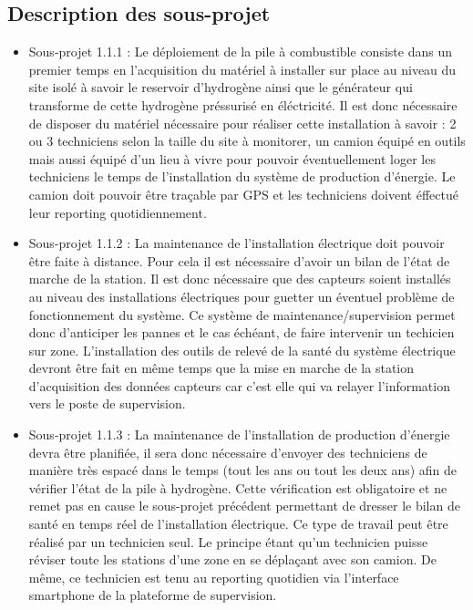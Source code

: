 \subsection{Description des sous-projet}

\begin{itemize}
\item Sous-projet 1.1.1 : Le déploiement de la pile à combustible consiste dans un premier temps en l'acquisition du matériel à installer sur place au niveau du site isolé à savoir le reservoir d'hydrogène ainsi que le générateur qui transforme de cette hydrogène préssurisé en éléctricité. Il est donc nécessaire de disposer du matériel nécessaire pour réaliser cette installation à savoir :  2 ou 3 techniciens selon la taille du site à monitorer, un camion équipé en outils mais aussi équipé d'un lieu à vivre pour pouvoir éventuellement loger les techniciens le temps de l'installation du système de production d'énergie. Le camion doit pouvoir être traçable par GPS et les techniciens doivent éffectué leur reporting quotidiennement.
\item Sous-projet 1.1.2 : La maintenance de l'installation électrique doit pouvoir être faite à distance. Pour cela il est nécessaire d'avoir un bilan de l'état de marche de la station. Il est donc nécessaire que des capteurs soient installés au niveau des installations électriques pour guetter un éventuel problème de fonctionnement du système. Ce système de maintenance/supervision permet donc d'anticiper les pannes et le cas échéant, de faire intervenir un techicien sur zone. L'installation des outils de relevé de la santé du système électrique devront être fait en même temps que la mise en marche de la station d'acquisition des données capteurs car c'est elle qui va relayer l'information vers le poste de supervision.
\item Sous-projet 1.1.3 : La maintenance de l'installation de production d'énergie devra être planifiée, il sera donc nécessaire d'envoyer des techniciens de manière très espacé dans le temps (tout les ans ou tout les deux ans) afin de vérifier l'état de la pile à hydrogène. Cette vérification est obligatoire et ne remet pas en cause le sous-projet précédent permettant de dresser le bilan de santé en temps réel de l'installation électrique. Ce type de travail peut être réalisé par un technicien seul. Le principe étant qu'un technicien puisse réviser toute les stations d'une zone en se déplaçant avec son camion. De même, ce technicien est tenu au reporting quotidien via l'interface smartphone de la plateforme de supervision.

\end{itemize}
